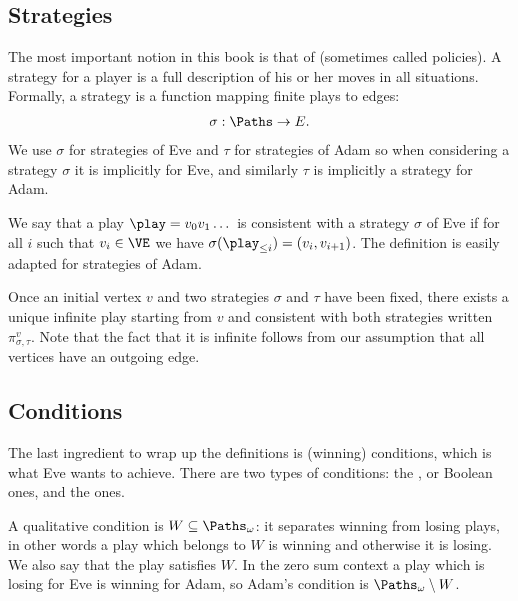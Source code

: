 \documentclass[letterpaper,10pt,english]{sphinxmanual}
\begin{document}
\subsection{Strategies}
\label{\detokenize{1_Introduction/simple:strategies}}\label{\detokenize{1_Introduction/simple:subsec-strategies}}
The most important notion in this book is that of 
(sometimes called policies). A strategy for a player is a full
description of his or her moves in all situations. Formally, a
strategy is a function mapping finite plays to edges:
\begin{equation*}
\begin{split}\sigma : \Paths \to E.\end{split}
\end{equation*}
We use \(\sigma\) for strategies of Eve and \(\tau\) for strategies of Adam
so when considering a strategy \(\sigma\) it is implicitly for Eve,
and similarly \(\tau\) is implicitly a strategy for Adam.

We say that a play \(\play = v_0 v_1 \dots\) is consistent with a strategy
\(\sigma\) of Eve if for all \(i\) such that \(v_i \in \VE\) we have
\(\sigma(\play_{\le i}) = (v_i,v_{i+1})\). The definition is easily
adapted for strategies of Adam.

Once an initial vertex \(v\) and two strategies \(\sigma\) and \(\tau\) have
been fixed, there exists a unique infinite play starting from \(v\) and
consistent with both strategies written \(\pi^{v}_{\sigma,\tau}\). Note
that the fact that it is infinite follows from our assumption that all
vertices have an outgoing edge.


\subsection{Conditions}
\label{\detokenize{1_Introduction/simple:conditions}}\label{\detokenize{1_Introduction/simple:subsec-conditions}}
The last ingredient to wrap up the definitions is (winning)
conditions, which is what Eve wants to achieve. There are two
types of conditions: the , or Boolean ones, and the
 ones.

A qualitative condition is \(W \subseteq \Paths_\omega\): it
separates winning from losing plays, in other words a play which belongs
to \(W\) is winning and otherwise it is losing. We also say that the play
satisfies \(W\). In the zero sum context a play which is losing for Eve is
winning for Adam, so Adam’s condition is \(\Paths_\omega \setminus W\).
\end{document}
